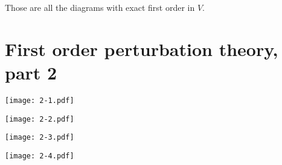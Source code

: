 \documentclass[11pt, english, fleqn, DIV=15, headinclude, BCOR=1cm]{scrartcl}
\begin{document}
Those are all the diagrams with exact first order in $V$.

\section{First order perturbation theory, part 2}
\label{homework:2}

\texttt{[image: 2-1.pdf]}

\texttt{[image: 2-2.pdf]}

\texttt{[image: 2-3.pdf]}

\texttt{[image: 2-4.pdf]}
\end{document}
